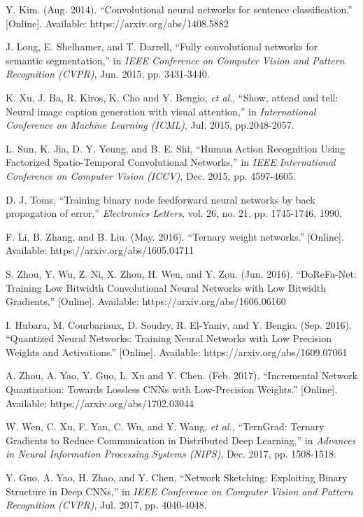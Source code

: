 \documentclass[twoside,twocolumn]{article}
\begin{document}
\begin{thebibliography}{00}
 Y. Kim. (Aug. 2014). ``Convolutional neural networks for sentence classification.'' [Online]. Available: https://arxiv.org/abs/1408.5882

 J. Long, E. Shelhamer, and T. Darrell, ``Fully convolutional networks for semantic segmentation,'' in \emph{IEEE Conference on Computer Vision and Pattern Recognition (CVPR)}, Jun. 2015, pp. 3431-3440.

 K. Xu, J. Ba, R. Kiros, K. Cho and Y. Bengio, \emph{et al.}, ``Show, attend and tell: Neural image caption generation with visual attention,'' in \emph{International Conference on Machine Learning (ICML)}, Jul. 2015, pp.2048-2057.

 L. Sun, K. Jia, D. Y. Yeung, and B. E. Shi, ``Human Action Recognition Using Factorized Spatio-Temporal Convolutional Networks,'' in \emph{IEEE International Conference on Computer Vision (ICCV)}, Dec. 2015, pp. 4597-4605.

 D. J. Toms, ``Training binary node feedforward neural networks by back propagation of error,'' \emph{Electronics Letters}, vol. 26, no. 21, pp. 1745-1746, 1990.

 F. Li, B. Zhang, and B. Liu. (May. 2016). ``Ternary weight networks.'' [Online]. Available: https://arxiv.org/abs/1605.04711

 S. Zhou, Y. Wu, Z. Ni, X. Zhou, H. Wen, and Y. Zou. (Jun. 2016). ``DoReFa-Net: Training Low Bitwidth Convolutional Neural Networks with Low Bitwidth Gradients,'' [Online]. Available: https://arxiv.org/abs/1606.06160

 I. Hubara, M. Courbariaux, D. Soudry, R. El-Yaniv, and Y. Bengio. (Sep. 2016). ``Quantized Neural Networks: Training Neural Networks with Low Precision Weights and Activations.'' [Online]. Available: https://arxiv.org/abs/1609.07061

 A. Zhou, A. Yao, Y. Guo, L. Xu and Y. Chen. (Feb. 2017). ``Incremental Network Quantization: Towards Lossless CNNs with Low-Precision Weights.'' [Online]. Available: https://arxiv.org/abs/1702.03044

 W. Wen, C. Xu, F. Yan, C. Wu, and Y. Wang, \emph{et al.}, ``TernGrad: Ternary Gradients to Reduce Communication in Distributed Deep Learning,'' in \emph{Advances in Neural Information Processing Systems (NIPS)}, Dec. 2017, pp. 1508-1518.

 Y. Guo, A. Yao, H. Zhao, and Y. Chen, ``Network Sketching: Exploiting Binary Structure in Deep CNNs,'' in \emph{IEEE Conference on Computer Vision and Pattern Recognition (CVPR)}, Jul. 2017, pp. 4040-4048.


\end{thebibliography}
\end{document}

